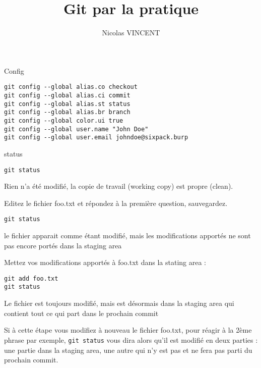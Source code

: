 \documentclass[10pt]{exam}
\title{Git par la pratique}
\author{Nicolas VINCENT}
\date{}
\begin{document}
 \maketitle
\thispagestyle{empty}
\begin{questions}



\question Config
\begin{lstlisting}
git config --global alias.co checkout
git config --global alias.ci commit
git config --global alias.st status
git config --global alias.br branch
git config --global color.ui true
git config --global user.name "John Doe"
git config --global user.email johndoe@sixpack.burp
\end{lstlisting}


\question status

\begin{lstlisting}
git status
\end{lstlisting}

Rien n'a été modifié, la copie de travail (working copy) est propre (clean).

Editez le fichier foo.txt et répondez à la première question, sauvegardez.

\begin{lstlisting}
git status
\end{lstlisting}

le fichier apparait comme étant modifié, mais les modifications apportés ne sont pas encore portés dans la staging area

Mettez vos modifications apportés à foo.txt dans la stating area :

\begin{lstlisting}
git add foo.txt
git status
\end{lstlisting}

Le fichier est toujours modifié, mais est désormais dans la staging area qui contient tout ce qui part dans le prochain commit

Si à cette étape vous modifiez à nouveau le fichier foo.txt, pour réagir à la 2ème phrase par exemple, \texttt{git status} vous dira alors qu'il est modifié en deux parties : une partie dans la staging area, une autre qui n'y est pas et ne fera pas parti du prochain commit.


\end{questions}
\end{document}
